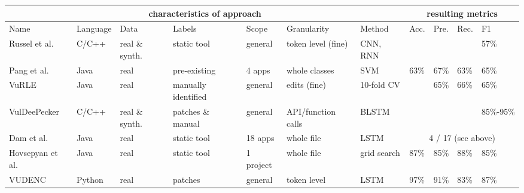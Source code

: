\documentclass[
a4paper,
pagesize,
pdftex,
12pt,
twoside, %
BCOR=5mm, %
ngerman,
fleqn,
final,
]{scrartcl}
\begin{document}
	\scriptsize
	\begin{tabular}{ | p{1.8cm} | p{1.2cm}|  p{0.7cm}| p{1.4cm} |  p{1.2cm} | p{1.5cm} | p{1.1cm} || p{0.4cm}|p{0.4cm}|p{0.4cm}|p{0.4cm}|  }
		\hline
		\multicolumn{7}{|c||}{characteristics of approach} & \multicolumn{4}{c|}{resulting metrics} \\
		\hline
		Name &  Language & Data & Labels & Scope &Granularity & Method & Acc. & Pre. & Rec. & F1  \\
		\hline
		Russel et al. & C/C++ & real \& synth. & static tool & general & token level (fine) & CNN, RNN &  &   &   &  57\%  \\
		\hline
		Pang et al. & Java & real  & pre-existing  & 4 apps & whole classes & SVM & 63\% & 67\%  & 63\%  & 65\%    \\
		\hline
		VuRLE & Java & real  & manually identified  & general & edits (fine) & 10-fold CV &  & 65\%  & 66\%  & 65\%    \\
		\hline
		VulDeePecker & C/C++ & real \& synth.  & patches \& manual & general & API/function calls & BLSTM &  &   &  & 85\%-95\%    \\
		\hline
		Dam et al. & Java & real &static tool & 18 apps & whole file & LSTM & \multicolumn{4}{c|}{ 4 / 17 (see above)}   \\
		\hline
		Hovsepyan et al. & Java & real  &static tool  & 1 project & whole file & grid search & 87\% & 	85\%  & 88\%  & 85\%   \\
		\hline
		VUDENC & Python & real  &patches& general  & token level & LSTM & 97\% & 91\% & 83\% & 87\%   \\
		\hline
		\hline 
	\end{tabular}\\
	\normalsize
	
\end{document}
